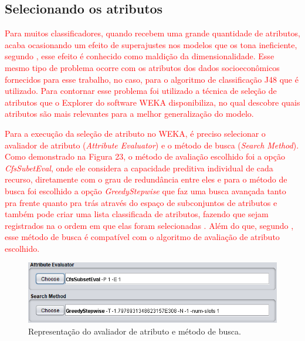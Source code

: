 \subsection{Selecionando os atributos}

\par
\textcolor{red}{Para muitos classificadores, quando recebem uma grande quantidade de atributos, acaba ocasionando um efeito de superajustes nos modelos que os tona ineficiente, segundo , esse efeito é conhecido como maldição da dimensionalidade. Esse mesmo tipo de problema ocorre com os atributos dos dados socioeconômicos fornecidos para esse trabalho, no caso, para o algoritmo de classificação J48 que é utilizado. Para contornar esse problema foi utilizado a técnica de seleção de atributos que o Explorer do software WEKA disponibiliza, no qual descobre quais atributos são mais relevantes para a melhor generalização do modelo.}

\par
\textcolor{red}{Para a execução da seleção de atributo no WEKA, é preciso selecionar o avaliador de atributo (\textit{Attribute Evaluator}) e o método de busca (\textit{Search Method}). Como demonstrado na Figura 23, o método de avaliação escolhido foi a opção \textit{CfsSubetEval}, onde ele considera a capacidade preditiva individual de cada recurso, diretamente com o grau de redundância entre eles e para o método de busca foi escolhido a opção \textit{GreedyStepwise} que faz uma busca avançada tanto pra frente quanto pra trás através do espaço de subconjuntos de atributos e também pode criar uma lista classificada de atributos, fazendo que sejam registrados na o ordem em que elas foram selecionadas \cite{WEKA}. Além do que, segundo , esse método de busca é compatível com o algoritmo de avaliação de atributo escolhido. }

\par
\begin{figure}[!htp]
	\begin{center}
    \caption{\label{fig:waveform_fig} Representação do avaliador de atributo e método de busca.}
	\includegraphics[scale=0.90]{Figuras/Avaliador_de_atributo.png}
	\end{center}
\end{figure}

